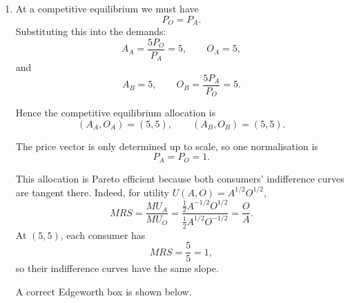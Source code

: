 \documentclass[12pt]{article}
\begin{document}
\begin{enumerate}[label=(\alph*)]
    Therefore the market-clearing condition is
    \[
    \boxed{P_O=P_A.}
    \]

    \item
    At a competitive equilibrium we must have
    \[
    P_O=P_A.
    \]
    Substituting this into the demands:
    \[
    A_A=\frac{5P_O}{P_A}=5,\qquad O_A=5,
    \]
    and
    \[
    A_B=5,\qquad O_B=\frac{5P_A}{P_O}=5.
    \]

    Hence the competitive equilibrium allocation is
    \[
    \boxed{(A_A,O_A)=(5,5),\qquad (A_B,O_B)=(5,5).}
    \]

    The price vector is only determined up to scale, so one normalisation is
    \[
    \boxed{P_A=P_O=1.}
    \]

    This allocation is Pareto efficient because both consumers' indifference curves are tangent there. Indeed, for utility \(U(A,O)=A^{1/2}O^{1/2}\),
    \[
    MRS=\frac{MU_A}{MU_O}
    =\frac{\frac12 A^{-1/2}O^{1/2}}{\frac12 A^{1/2}O^{-1/2}}
    =\frac{O}{A}.
    \]
    At \((5,5)\), each consumer has
    \[
    MRS=\frac{5}{5}=1,
    \]
    so their indifference curves have the same slope.

    A correct Edgeworth box is shown below.

\begin{center}
\end{center}
\end{enumerate}
\end{document}
